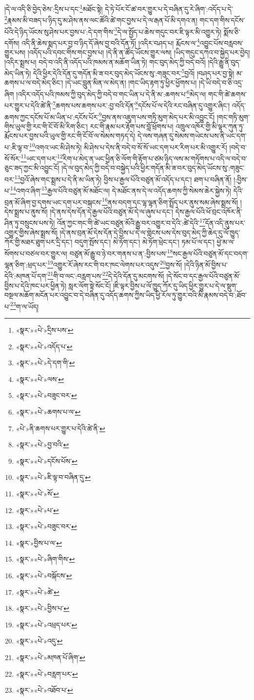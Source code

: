 །དེ་ལ་འདི་ཅི་བྱེད་ཅེས་:དྲིས་པ་དང་\footnote{«སྣར་»«པེ་»དྲིས་པས་}མཐོང་སྟེ། དེ་ཏེ་པོར་ངོ་ཚ་བར་གྱུར་པ་དེ་བཞིན་དུ་རེ་ཞིག་:འདོད་པ་དེ་\footnote{«སྣར་»«པེ་»འདོད་པ་}རྣམས་མི་བཟད་པ་ཉིད་དུ་མ་ཤེས་ནས་ལང་ཚོའི་ཚེ་གང་བྱས་པ་དེ་ལ་རྒན་པོ་མི་དགའ་ན། གང་དག་གིས་དངོས་པོའི་དེ་ཉིད་ཡོངས་སུ་ཤེས་པར་བྱས་པ་:དེ་དག་གིས་\footnote{«སྣར་»«པེ་»དེ་དག་གི་}དེ་ལ་སྤྱོད་པ་ཆེས་གདུང་བར་ཇི་ལྟར་མི་འགྱུར་ཏེ། སྨོས་ཅི་དགོས། འདི་ནི་ཆེས་སྨད་པར་བྱ་བ་ཉིད་དོ་ཞེས་བྱ་བའི་དོན་ཏོ། །འདིར་བཤད་པ། རྨོངས་ལ་\footnote{«སྣར་»«པེ་»ལས་}འབྱུང་པོས་བརླབས་གྱུར་པས། །འདོད་པའི་དབང་གིས་གང་བྱས་པ། །དེ་ནི་ན་ཚོད་ཡོངས་གྱུར་ལས། །ཡིད་གདུང་དཀའ་བ་སྐྱེད་པར་བྱེད། །འདིར་སྨྲས་པ། བདེ་བ་འདི་ནི་འདོད་པའི་ཁམས་ན་མཆོག་ཡིན་ཏེ། གང་བུད་མེད་ཀྱི་བདེ་བའོ། །དེའི་རྒྱུ་ནི་བུད་མེད་ཡིན་ཏེ། དེའི་ཕྱིར་དེའི་དོན་དུ་གདོན་མི་ཟ་བར་བུད་མེད་ཡོངས་སུ་:གཟུང་བར་\footnote{«སྣར་»«པེ་»བཟུང་བར་}བྱའོ། །བཤད་པར་བྱ་སྟེ། མ་ཆགས་པ་ལ་བདེ་མེད་ཅིང་། །དེ་ཡང་བླུན་མིན་ལ་མེད་ན། །གང་ཡིད་རྟག་ཏུ་ཕྱིར་ཕྱོགས་པ། །དེ་ཡི་བདེ་བ་ཅི་འདྲ་ཞིག །འདིར་འདོད་པའི་ཁམས་ཀྱི་བུད་མེད་ཀྱི་བདེ་བ་གང་ཡིན་པ་དེ་ནི་མ་:ཆགས་པ་\footnote{«སྣར་»«པེ་»ཆགས་པ་ལ་}མེད་ལ། གང་གི་ཚེ་ཆགས་པར་གྱུར་པ་དེའི་ཚེ་ནི་\footnote{«པེ་»ནི་ཆགས་པར་གྱུར་པ་དེའི་ཚེ་ནི་}ཆགས་པས་ཆགས་པར་:བྱ་བའི་དོན་\footnote{«སྣར་»«པེ་»བྱ་བའི་}དངོས་པོ་ལ་དེའི་རང་བཞིན་དུ་འགྱུར་ཞིང་། འདོད་ཆགས་ཀྱང་དངོས་པོ་མ་ཡིན་པ་:དངོས་པོར་\footnote{«སྣར་»«པེ་»དངོས་པོས་}བྱས་ནས་འཇུག་པས་གཏི་མུག་མེད་པར་མི་འབྱུང་ངོ། །གང་གཏི་མུག་གིས་ཡུལ་གྱི་རང་གི་ངོ་བོ་མི་རིག་ཅིང་། རང་གི་རྣམ་པར་རྟོག་པས་བློ་ཕྲོགས་པ། འཁྲུལ་འཁོར་གྱི་མི་ལྟར་ཀུན་ཏུ་རྨོངས་པར་བྱས་པའི་ཡུལ་གྱི་རང་གི་ངོ་བོ་ལ་སེམས་གཏད་དེ། དེ་ལས་གཞན་དུ་སེམས་གཡེངས་པས་ནི་ཡང་དག་པ་:ཇི་ལྟ་བ་\footnote{«སྣར་»«པེ་»ཇི་ལྟ་བ་བཞིན་དུ་}འགའ་ཡང་མི་ཤེས་ཏེ། མི་ཤེས་པ་དེས་ནི་བདེ་བ་སོ་སོ་ཡང་དག་པར་རིག་པར་མི་འགྱུར་རོ། །བདེ་བ་སོ་སོར་\footnote{«སྣར་»«པེ་»སོ་}ཡང་དག་པར་\footnote{«སྣར་»«པེ་»པ་}རིག་པ་མེད་ན་ཡང་ཕྱིན་ཅི་ལོག་གི་རྟོག་པ་ཙམ་ཉིད་ལས་མ་གཏོགས་པ་འདི་ལ་བདེ་བ་ཅུང་ཟད་ཀྱང་མི་འབྱུང་ངོ། །དེ་ལ་བུད་མེད་ཀྱི་བདེ་བ་བསྐྱེད་པའི་ཕྱིར་གདོན་མི་ཟ་བར་བུད་མེད་ཡོངས་སུ་:གཟུང་བར་\footnote{«སྣར་»«པེ་»བཟུང་བར་}བྱའོ་ཞེས་གང་སྨྲས་པ་དེ་ནི་མ་ཡིན་ཏེ། བྱིས་པ་རྒྱལ་པོའི་བཙུན་མོ་འདོད་པ་དང་། ཐག་པ་བཞིན་ནོ། །:བྱིས་པ་\footnote{«སྣར་»བྱིས་པ་ལ་}འགའ་ཞིག་\footnote{«སྣར་»«པེ་»ཞིག་གིས་}རྒྱལ་པོའི་བཙུན་མོ་མཐོང་ལ། དེ་མཐོང་ནས་དེ་ལ་འདོད་ཆགས་ཀྱི་སེམས་ཆེར་སྐྱེས་ཏེ། དེའི་བྲན་མོ་ཞིག་བྱ་དགས་ཡང་དག་པར་བསྐངས་\footnote{«སྣར་»«པེ་»བསྐོངས་}ནས་བདག་དང་ལྷ་ལྷན་ཅིག་སྤྲོད་པར་ནུས་སམ་ཞེས་སྨྲས་སོ། །དེས་སྨྲས་པ་ནུས་སོ། །དེ་ནས་དེས་དོན་དེ་རྒྱལ་པོའི་བཙུན་མོ་དེ་ལ་ཞུས་པ་དང་། དེས་རྒྱལ་པོའི་ཕོ་བྲང་འཁོར་ནི་ཤིན་ཏུ་བསྲུངས་པས་ཏེ། འོན་ཀྱང་གང་གི་ཚེ་ཡང་བཙུན་མོའི་རྒྱུ་བར་འགྱུར་བ་དེའི་:ཚེ་དེའི་\footnote{«སྣར་»«པེ་»ཚེ་}དོན་འདི་ནུས་པར་འགྱུར་གྱིས་ཞེས་སྨྲས་སོ། །དེ་ནས་བྲན་མོ་དེས་དོན་དེ་བྱིས་པ་དེ་ལ་གླེངས་པས་དེས་བུད་མེད་ཀྱི་ཆེད་དུ་ལོ་ཁྱུད་ཀོར་གྱི་མཐར་ཐུག་པར་དྲི་དང་། བདུག་སྤོས་དང་། མེ་ཏོག་དང་། མེ་ཏོག་ཕྲེང་དང་། ཏམ་པོ་ལ་དང་། ཕྱེ་མ་ལ་སོགས་པ་བཙལ་བར་གྱུར་ལ། བཙུན་མོ་རྒྱུ་བ་ཉེ་བར་གནས་པ་ན་:བྱིས་པས་\footnote{«སྣར་»«པེ་»བྱིས་པ་}སང་རྒྱལ་པོའི་བཙུན་མོ་དང་བདག་ལྷན་ཅིག་:ཕྲད་པར་\footnote{«སྣར་»«པེ་»འཕྲད་པར་}འགྱུར་རོ་ཞེས་རང་གི་བར་ཁང་ལེགས་པར་འདུས་\footnote{«སྣར་»«པེ་»འདུ་}བྱས་སོ། །དེའི་ཉིན་མོ་བྱིས་པ་དེའི་:མཁན་པོ་དག་\footnote{«སྣར་»«པེ་»མཁན་པོ་ཞིག་}གི་བ་ལང་:བརླག་པས་\footnote{«སྣར་»«པེ་»བརླག་པར་}དེ་དེའི་དོན་དུ་མངགས་སོ། །དེ་སོང་བ་དང་རྒྱལ་པོའི་བཙུན་མོ་བྱིས་པ་དེའི་ཁང་པར་ཕྱིན་ཏེ། སླར་ལོག་སྟེ་སོང་ངོ། །ཇི་ལྟར་བྱིས་པ་ལོ་ཁྱུད་ཀོར་དུ་ཡིད་ཕྱིར་གྱུར་པ་དེ་ལ་སྡུག་བསྔལ་མཆོག་མངོན་པར་འབྱུང་བ་དེ་བཞིན་དུ་འདོད་ཆགས་ཀྱིས་ཡིད་ཕྱི་རོལ་ཏུ་གྱུར་བའི་མི་རྣམས་བདེ་བ་:ཐོབ་པ་\footnote{«སྣར་»«པེ་»འཐོབ་པ་}ག་ལ་ཡོད། 